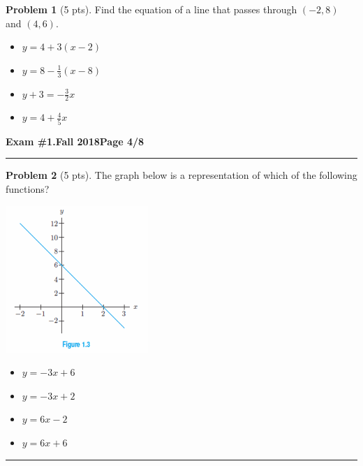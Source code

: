 \documentclass[12pt]{article}
\makeatletter
\theoremstyle{definition}
\newtheorem{problem}{Problem}
\newcommand*{\radiobutton}{%
  \@ifstar{\@radiobutton0}{\@radiobutton1}%
}
\newcommand*{\@radiobutton}[1]{%
  \begin{tikzpicture}
    \pgfmathsetlengthmacro\radius{height("X")/2}
    \draw[radius=\radius] circle;
    \ifcase#1 \fill[radius=.6*\radius] circle;\fi
  \end{tikzpicture}%
}
\makeatother
\begin{document}
\begin{problem}[5 pts]
  Find the equation of a line that passes through $(-2,8)$ and $(4,6)$.
  \begin{itemize}
  \item[\radiobutton] $y=4+3(x-2)$
  \item[\radiobutton] $y=8-\tfrac{1}{3}(x-8)$
  \item[\radiobutton] $y+3=-\tfrac{3}{2}x$
  \item[\radiobutton] $y=4+\tfrac{4}{5}x$
  \end{itemize}
\end{problem}

\newpage

\hfill{\large\bf Exam \#1.}\hfill{\large\bf Fall 2018}\hfill{\large\bf Page 4/8}\hrule

\bigskip
\begin{problem}[5 pts]
  The graph below is a representation of which of the following functions?
  \begin{multicols}{2}
    \begin{center}
      \includegraphics{1graph2.png}
    \end{center}
    \begin{itemize}
    \item[\radiobutton] $y=-3x+6$
    \item[\radiobutton] $y=-3x+2$
    \item[\radiobutton] $y=6x-2$
    \item[\radiobutton] $y=6x+6$
    \end{itemize}
  \end{multicols}
\end{problem}
\hrule
\end{document}
